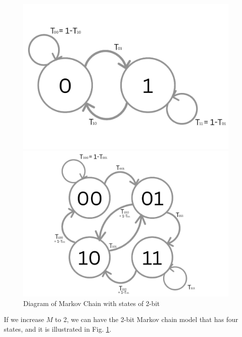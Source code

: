 \begin{figure}[h]
    \centering
    \begin{minipage}{0.45\textwidth}
        \centering
        \includegraphics[width=\textwidth]{figures/MKV1.pdf}
        \caption{Diagram of Markov Chain with states of 1-bit}
        \label{fig:MKV1}
    \end{minipage}
    \hfill
    \begin{minipage}{0.45\textwidth}
        \centering
        \includegraphics[width=\textwidth]{figures/MKV2.pdf}
        \caption{Diagram of Markov Chain with states of 2-bit}
        \label{fig:MKV2}
    \end{minipage}
\end{figure}

If we increase \( M \) to 2, we can have the 2-bit Markov chain model that has four states, and it is illustrated in Fig. \ref{fig:MKV2}.


